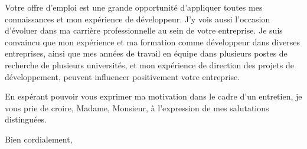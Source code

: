 \documentclass[11pt,a4paper]{letter} %
\begin{document}
\begin{letter}

Votre offre d'emploi est une grande opportunité d'appliquer toutes mes connaissances et mon expérience de développeur. J'y vois aussi l'occasion d'évoluer dans ma carrière professionnelle au sein de votre entreprise. Je suis convaincu que mon expérience et ma formation comme développeur dans diverses entreprises, ainsi que mes années de travail en équipe dans plusieurs postes de recherche de plusieurs universités, et mon expérience de direction des projets de développement, peuvent influencer positivement votre entreprise. 



En espérant pouvoir vous exprimer ma motivation dans le cadre d'un entretien, je vous prie de croire, Madame, Monsieur, à l'expression de mes salutations distinguées.

\closing{Bien cordialement,}


\end{letter}
\end{document}
